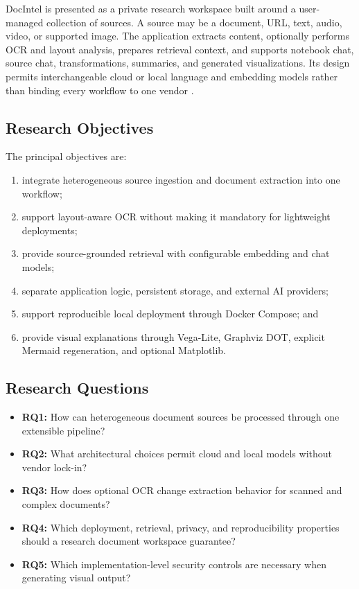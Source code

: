 \documentclass[conference]{IEEEtran}
\begin{document}
DocIntel is presented as a private research workspace built around a user-managed collection of sources. A source may be a document, URL, text, audio, video, or supported image. The application extracts content, optionally performs OCR and layout analysis, prepares retrieval context, and supports notebook chat, source chat, transformations, summaries, and generated visualizations. Its design permits interchangeable cloud or local language and embedding models rather than binding every workflow to one vendor \cite{docintel}.

\subsection{Research Objectives}
The principal objectives are:
\begin{enumerate}
  \item integrate heterogeneous source ingestion and document extraction into one workflow;
  \item support layout-aware OCR without making it mandatory for lightweight deployments;
  \item provide source-grounded retrieval with configurable embedding and chat models;
  \item separate application logic, persistent storage, and external AI providers;
  \item support reproducible local deployment through Docker Compose; and
  \item provide visual explanations through Vega-Lite, Graphviz DOT, explicit Mermaid regeneration, and optional Matplotlib.
\end{enumerate}

\subsection{Research Questions}
\begin{itemize}
  \item \textbf{RQ1:} How can heterogeneous document sources be processed through one extensible pipeline?
  \item \textbf{RQ2:} What architectural choices permit cloud and local models without vendor lock-in?
  \item \textbf{RQ3:} How does optional OCR change extraction behavior for scanned and complex documents?
  \item \textbf{RQ4:} Which deployment, retrieval, privacy, and reproducibility properties should a research document workspace guarantee?
  \item \textbf{RQ5:} Which implementation-level security controls are necessary when generating visual output?
\end{itemize}
\end{document}
